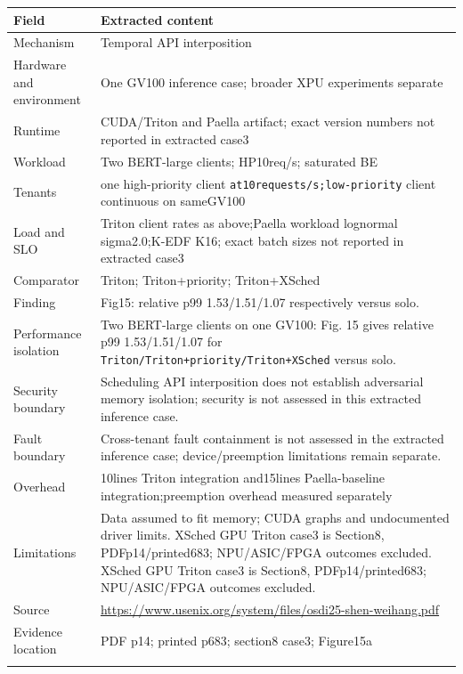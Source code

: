 \begin{longtable}{>{\raggedright\arraybackslash}p{}>{\raggedright\arraybackslash}p{}}
\toprule
\textbf{Field} & \textbf{Extracted content}\\\midrule\endhead
Mechanism & Temporal API interposition\\\addlinespace
Hardware and environment & One GV100 inference case; broader XPU experiments separate\\\addlinespace
Runtime & CUDA/Triton and Paella artifact; exact version numbers not reported in extracted case3\\\addlinespace
Workload & Two BERT-large clients; HP10req/s; saturated BE\\\addlinespace
Tenants & one high-priority client \nolinkurl{at10requests/s;low-priority} client continuous on sameGV100\\\addlinespace
Load and SLO & Triton client rates as above;Paella workload lognormal sigma2.0;K-EDF K16; exact batch sizes not reported in extracted case3\\\addlinespace
Comparator & Triton; Triton+priority; Triton+XSched\\\addlinespace
Finding & Fig15: relative p99 1.53/1.51/1.07 respectively versus solo.\\\addlinespace
Performance isolation & Two BERT-large clients on one GV100: Fig. 15 gives relative p99 1.53/1.51/1.07 for \nolinkurl{Triton/Triton+priority/Triton+XSched} versus solo.\\\addlinespace
Security boundary & Scheduling API interposition does not establish adversarial memory isolation; security is not assessed in this extracted inference case.\\\addlinespace
Fault boundary & Cross-tenant fault containment is not assessed in the extracted inference case; device/preemption limitations remain separate.\\\addlinespace
Overhead & 10lines Triton integration and15lines Paella-baseline integration;preemption overhead measured separately\\\addlinespace
Limitations & Data assumed to fit memory; CUDA graphs and undocumented driver limits. XSched GPU Triton case3 is Section8, PDFp14/printed683; NPU/ASIC/FPGA outcomes excluded. XSched GPU Triton case3 is Section8, PDFp14/printed683; NPU/ASIC/FPGA outcomes excluded.\\\addlinespace
Source & \url{https://www.usenix.org/system/files/osdi25-shen-weihang.pdf}\\\addlinespace
Evidence location & PDF p14; printed p683; section8 case3; Figure15a\\\addlinespace
\bottomrule\end{longtable}

